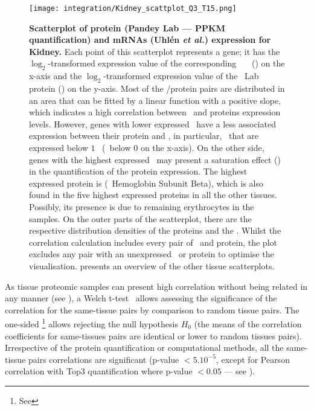 \begin{figure}[!htbp]
    \texttt{[image: integration/Kidney\_scattplot\_Q3\_T15.png]}\centering
    \caption[Scatterplot of protein (Pandey Lab data --- PPKM quantification)
    and mRNA (Uhlén \etal) expression for Kidney]
    {\label{fig:ScatKid}\textbf{Scatterplot of
    protein (Pandey Lab --- PPKM quantification) and mRNAs (Uhlén \textit{et al.})
    expression for Kidney.}
    Each point of this scatterplot represents a gene;
    it has the $\log_2$-transformed expression value
    of the corresponding \uhlen\ \etal\ \mRNA\ (\FPKM) on the x-axis and
    the $\log_2$-transformed expression value of
    the \pandey\ Lab protein (\PPKM) on the y-axis.
    Most of the \mRNA/protein pairs are distributed in an area
    that can be fitted by a linear function with a positive slope,
    which indicates a high correlation between \mRNAs\ and proteins expression
    levels.
    However, genes with lower expressed \mRNAs\ have
    a less associated expression between their protein and \mRNA,
    in particular, \mRNAs\ that are expressed
    below $1$ \FPKM\ (\ie\ below $0$ on the x-axis).
    On the other side, genes with the highest expressed \mRNAs\ may present
    a saturation effect ()
    in the quantification of the protein expression.
    The highest expressed protein is 
    (\ie\ Hemoglobin Subunit Beta), which is also found in
    the five highest expressed proteins in all the other tissues.
    Possibly, its presence is due to remaining erythrocytes in the samples.
    On the outer parts of the scatterplot,
    there are the respective distribution densities of the proteins and the \mRNAs.
    Whilst the correlation calculation includes every pair of \mRNA\ and protein,
    the plot excludes any pair with an unexpressed \mRNA\ or protein to optimise the visualisation.
     presents an overview of the other tissue scatterplots.
    }
\end{figure}

As tissue proteomic samples can present high correlation
without being related in any manner
(see ),
a Welch t-test~ allows
assessing the significance of the correlation for the same-tissue pairs
by comparison to random tissue pairs.
The one-sided \Welchttest\footnote{See }
allows rejecting the null hypothesis $H_0$
(the means of the correlation coefficients for same-tissues pairs
are identical or lower to random tissues pairs).
Irrespective of the protein quantification or computational methods,
all the same-tissue pairs correlations are significant
(p-value $<5.10^{-5}$, except for Pearson correlation with Top3 quantification
where p-value $<0.05$ --- see ).\mybr\

